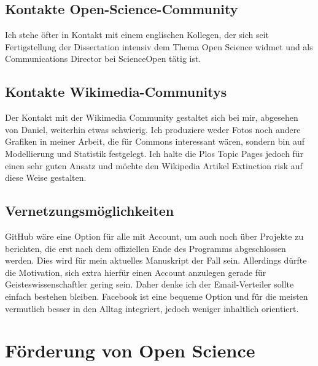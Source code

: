 \documentclass[11pt,a4paper]{article}
\begin{document}
\subsection{Kontakte Open-Science-Community}%
Ich stehe öfter in Kontakt mit einem englischen Kollegen, der sich seit Fertigstellung der Dissertation intensiv dem Thema Open Science widmet und als Communications Director bei ScienceOpen tätig ist.


\subsection{Kontakte Wikimedia-Communitys}%
Der Kontakt mit der Wikimedia Community gestaltet sich bei mir, abgesehen von Daniel, weiterhin etwas schwierig. Ich produziere weder Fotos noch andere Grafiken in meiner Arbeit, die für Commons interessant wären, sondern bin auf Modellierung und Statistik festgelegt. Ich halte die Plos Topic Pages jedoch für einen sehr guten Ansatz und möchte den Wikipedia Artikel Extinction risk auf diese Weise gestalten. 

\subsection{Vernetzungsmöglichkeiten} %
GitHub wäre eine Option für alle mit Account, um auch noch über Projekte zu berichten, die erst nach dem offiziellen Ende des Programms abgeschlossen werden. Dies wird für mein aktuelles Manuskript der Fall sein. Allerdings dürfte die Motivation, sich extra hierfür einen Account anzulegen gerade für Geisteswissenschaftler gering sein. Daher denke ich der Email-Verteiler sollte einfach bestehen bleiben. Facebook ist eine bequeme Option und für die meisten vermutlich besser in den Alltag integriert, jedoch weniger inhaltlich orientiert. 





\section{Förderung von Open Science} %
\end{document}
